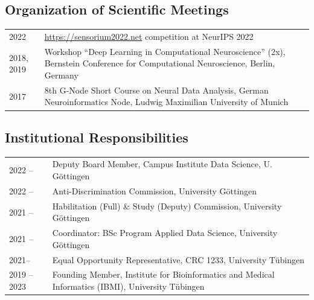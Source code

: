 \documentclass[COG,11pt]{ercgrant}
\begin{document}
\subsection{Organization of Scientific Meetings}
\begin{tabular}{p{3cm}p{12cm}}
2022 & \url{https://sensorium2022.net} competition at NeurIPS 2022\\
2018, 2019  & Workshop ``Deep Learning in Computational Neuroscience'' (2x), Bernstein Conference for Computational Neuroscience, Berlin, Germany\\
2017 & 8th G-Node Short Course on Neural Data Analysis, German Neuroinformatics Node, Ludwig Maximilian University of Munich\\
\end{tabular}


\subsection{Institutional Responsibilities}
\begin{tabular}{p{3cm}p{12cm}}
2022 -- & Deputy Board Member, Campus Institute Data Science, U. Göttingen\\
2022 -- & Anti-Discrimination Commission, University Göttingen\\
2021 -- & Habilitation (Full) \& Study (Deputy) Commission, University Göttingen\\
2021 -- & Coordinator: BSc Program Applied Data Science, University Göttingen\\
2021-- & Equal Opportunity Representative, CRC 1233, University T{\"u}bingen\\
2019 -- 2023 & Founding Member, Institute for Bioinformatics and Medical Informatics (IBMI), University T{\"u}bingen \\
\end{tabular}
\end{document}
